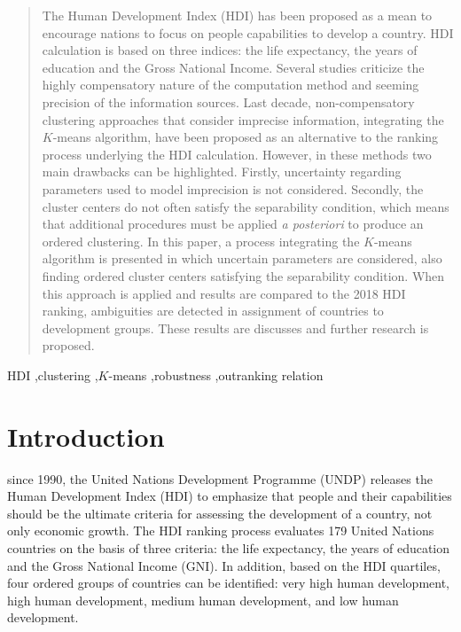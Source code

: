 \documentclass[]{elsarticle}
\theoremstyle{definition}
\begin{document}
\begin{frontmatter}
\begin{abstract}
The Human Development Index (HDI) has been proposed as a mean to encourage nations to focus on people capabilities to develop a country.  HDI calculation is based on three indices: the life expectancy, the years of education and the Gross National Income. Several studies criticize the highly compensatory nature of the computation method and seeming precision of the information sources. Last decade, non-compensatory clustering approaches that consider imprecise information, integrating the $K$-means algorithm,  have been proposed as an alternative to the ranking process underlying the HDI calculation. However, in these methods two main drawbacks can be highlighted. Firstly, uncertainty regarding parameters used to model imprecision is not considered. Secondly,  the cluster centers do not often satisfy the separability condition, which means that additional procedures must be applied \emph{a posteriori} to produce an ordered clustering. In this paper, a process integrating  the $K$-means algorithm is presented in which uncertain parameters are considered, also finding  ordered cluster centers satisfying the separability condition.  When this approach is applied and results are compared to the 2018 HDI ranking, ambiguities are detected in assignment of countries to development groups. These results are discusses and further research is proposed.
\end{abstract}

\begin{keyword}
HDI \sep clustering \sep $K$-means \sep robustness \sep outranking relation 
\end{keyword}

\end{frontmatter}


\section{Introduction}

since 1990, the United Nations Development Programme (UNDP) releases the Human Development Index (HDI) to emphasize that people and their capabilities should be the ultimate criteria for assessing the development of a country, not only economic growth. The HDI ranking process evaluates  179 United Nations countries on the basis of three criteria: the life expectancy, the years of education and the Gross National Income (GNI). In addition, based on the HDI quartiles, four ordered groups of countries can be identified: very high human development, high human development, medium human development, and low human development.  
\end{document}
